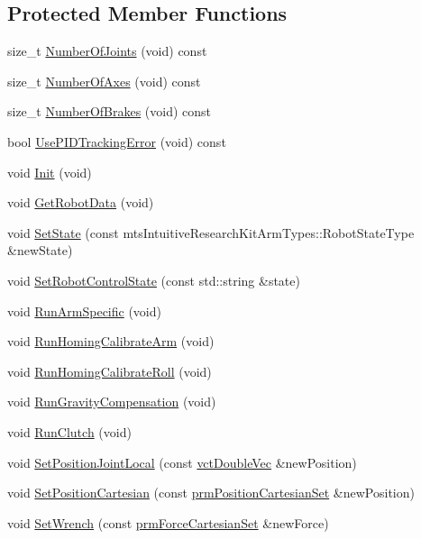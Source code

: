 \subsection*{Protected Member Functions}
\begin{DoxyCompactItemize}
\item 
size\+\_\+t \hyperlink{classmts_intuitive_research_kit_m_t_m_ab2c930542fd9bb5fb9980d58b5adfcc7}{Number\+Of\+Joints} (void) const 
\item 
size\+\_\+t \hyperlink{classmts_intuitive_research_kit_m_t_m_a3cca37b4a49b33d50e084adcab2056ce}{Number\+Of\+Axes} (void) const 
\item 
size\+\_\+t \hyperlink{classmts_intuitive_research_kit_m_t_m_a9637724648d75a357ef42b92ee56f60d}{Number\+Of\+Brakes} (void) const 
\item 
bool \hyperlink{classmts_intuitive_research_kit_m_t_m_a4ee00fbedb0e9144c887293c0c6424da}{Use\+P\+I\+D\+Tracking\+Error} (void) const 
\item 
void \hyperlink{classmts_intuitive_research_kit_m_t_m_ae8cdb74e1c7d5464ab038fa9f6c642cb}{Init} (void)
\item 
void \hyperlink{classmts_intuitive_research_kit_m_t_m_a261f7401fdf791cf6173c16f1f6223a2}{Get\+Robot\+Data} (void)
\item 
void \hyperlink{classmts_intuitive_research_kit_m_t_m_a81e00eb2f9f23dd10946130e0192956c}{Set\+State} (const mts\+Intuitive\+Research\+Kit\+Arm\+Types\+::\+Robot\+State\+Type \&new\+State)
\item 
void \hyperlink{classmts_intuitive_research_kit_m_t_m_ac41903292eb113d8acf340178dc10aa7}{Set\+Robot\+Control\+State} (const std\+::string \&state)
\item 
void \hyperlink{classmts_intuitive_research_kit_m_t_m_ab0b7000dfd8271c958a3f24e0c454b38}{Run\+Arm\+Specific} (void)
\item 
void \hyperlink{classmts_intuitive_research_kit_m_t_m_ab668fdb4d21a27e39afe975c3f04318e}{Run\+Homing\+Calibrate\+Arm} (void)
\item 
void \hyperlink{classmts_intuitive_research_kit_m_t_m_a287fc386c6c87a6612f0800cc596eacc}{Run\+Homing\+Calibrate\+Roll} (void)
\item 
void \hyperlink{classmts_intuitive_research_kit_m_t_m_a71163659ee63d9a3b8b8dc6c8ae0cfe7}{Run\+Gravity\+Compensation} (void)
\item 
void \hyperlink{classmts_intuitive_research_kit_m_t_m_a7ce7066c3edf0865eadc32cfa2a76fad}{Run\+Clutch} (void)
\item 
void \hyperlink{classmts_intuitive_research_kit_m_t_m_a1952b2fe6b8209764a696b7f903cfd7b}{Set\+Position\+Joint\+Local} (const \hyperlink{vct_dynamic_vector_types_8h_ade4b3068c86fb88f41af2e5187e491c2}{vct\+Double\+Vec} \&new\+Position)
\item 
void \hyperlink{classmts_intuitive_research_kit_m_t_m_ae3b7787ae6b15ea2920d2b6de28e922b}{Set\+Position\+Cartesian} (const \hyperlink{classprm_position_cartesian_set}{prm\+Position\+Cartesian\+Set} \&new\+Position)
\item 
void \hyperlink{classmts_intuitive_research_kit_m_t_m_a835a1cee4c443c5ce4825af73ac81288}{Set\+Wrench} (const \hyperlink{classprm_force_cartesian_set}{prm\+Force\+Cartesian\+Set} \&new\+Force)
\end{DoxyCompactItemize}
